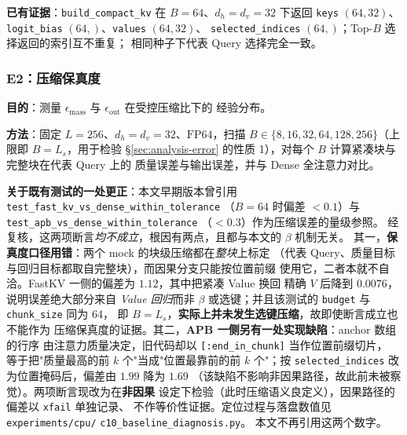 \textbf{已有证据}：\texttt{build\_compact\_kv} 在 $B=64$、$d_h=d_v=32$ 下返回
\texttt{keys} $(64,32)$、\texttt{logit\_bias} $(64,)$、\texttt{values} $(64,32)$、
\texttt{selected\_indices} $(64,)$；Top-$B$ 选择返回的索引互不重复；
相同种子下代表 Query 选择完全一致。

\subsubsection{E2：压缩保真度}

\textbf{目的}：测量 $\epsilon_{\text{mass}}$ 与 $\epsilon_{\text{out}}$ 在受控压缩比下的
经验分布。

\textbf{方法}：固定 $L=256$、$d_h=d_v=32$、$\mathrm{FP64}$，扫描
$B \in \{8, 16, 32, 64, 128, 256\}$（上限即 $B=L_s$，用于检验
\S\ref{sec:analysis-error} 的性质 1），对每个 $B$ 计算紧凑块与完整块在代表 Query 上的
质量误差与输出误差，并与 Dense 全注意力对比。

{\sloppy
\textbf{关于既有测试的一处更正}：本文早期版本曾引用
\texttt{test\_fast\_kv\_}\allowbreak\texttt{vs\_dense\_}\allowbreak\texttt{within\_tolerance}
（$B=64$ 时偏差 $<0.1$）与
\texttt{test\_apb\_}\allowbreak\texttt{vs\_dense\_}\allowbreak\texttt{within\_tolerance}
（$<0.3$）作为压缩误差的量级参照。
经复核，这两项断言\emph{均不成立}，根因有两点，且都与本文的 $\beta$ 机制无关。
其一，\textbf{保真度口径用错}：两个 mock 的块级压缩都在\emph{整块}上标定
（代表 Query、质量目标与回归目标都取自完整块），而因果分支只能按位置前缀
使用它，二者本就不自洽。FastKV 一侧的偏差为 $1.12$，其中把紧凑 Value 换回
精确 $V$ 后降到 $0.0076$，说明误差绝大部分来自 \emph{Value 回归}而非 $\beta$
或选键；并且该测试的 \texttt{budget} 与 \texttt{chunk\_size} 同为 $64$，
即 $B = L_s$，\textbf{实际上并未发生选键压缩}，故即使断言成立也不能作为
压缩保真度的证据。其二，\textbf{APB 一侧另有一处实现缺陷}：anchor 数组的行序
由注意力质量决定，旧代码却以 \texttt{[:end\_in\_chunk]} 当作位置前缀切片，
等于把"质量最高的前 $k$ 个"当成"位置最靠前的前 $k$ 个"；按
\texttt{selected\_indices} 改为位置掩码后，偏差由 $1.99$ 降为 $1.69$
（该缺陷不影响非因果路径，故此前未被察觉）。两项断言现改为在\textbf{非因果}
设定下检验（此时压缩语义良定义），因果路径的偏差以 \texttt{xfail} 单独记录、
不作等价性证据。定位过程与落盘数值见
\texttt{experiments/}\allowbreak\texttt{cpu/}\allowbreak
\texttt{c10\_baseline\_}\allowbreak\texttt{diagnosis.py}。
本文不再引用这两个数字。
\par}

